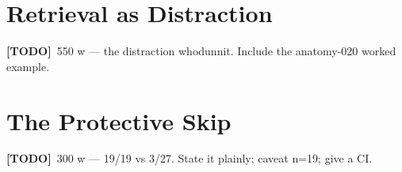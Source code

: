 \documentclass[11pt,a4paper]{report}
\newcommand{\todo}[1]{\par\noindent\textcolor{red!70!black}{\small\textbf{[TODO]}~#1}\par}
\begin{document}
\section{Retrieval as Distraction}
\label{sec:eval-distraction}
\todo{550 w — the distraction whodunnit. Include the anatomy-020 worked example.}

\section{The Protective Skip}
\label{sec:eval-protective}
\todo{300 w — 19/19 vs 3/27. State it plainly; caveat n=19; give a CI.}
\end{document}
